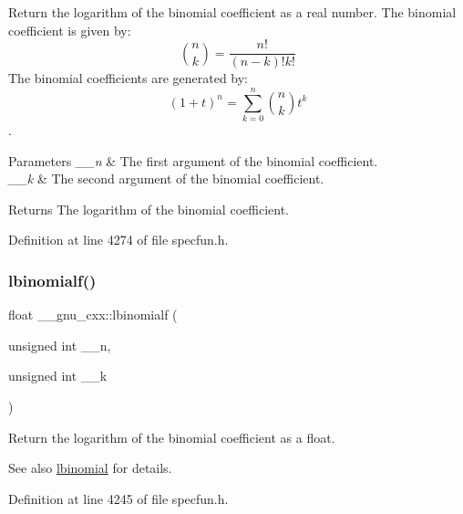 Return the logarithm of the binomial coefficient as a real number. The binomial coefficient is given by\+: \[ \binom{n}{k} = \frac{n!}{(n-k)! k!} \] The binomial coefficients are generated by\+: \[ \left(1 + t\right)^n = \sum_{k=0}^n \binom{n}{k} t^k \]. 


\begin{DoxyParams}{Parameters}
{\em \+\_\+\+\_\+n} & The first argument of the binomial coefficient. \\
\hline
{\em \+\_\+\+\_\+k} & The second argument of the binomial coefficient. \\
\hline
\end{DoxyParams}
\begin{DoxyReturn}{Returns}
The logarithm of the binomial coefficient. 
\end{DoxyReturn}


Definition at line 4274 of file specfun.\+h.

\mbox{\label{group__gnu__math__spec__func_ga2fe55bab4211fb240e1eb01341914129}} 
\subsubsection{\texorpdfstring{lbinomialf()}{lbinomialf()}}
{\footnotesize\ttfamily float \+\_\+\+\_\+gnu\+\_\+cxx\+::lbinomialf (\begin{DoxyParamCaption}\item[{unsigned int}]{\+\_\+\+\_\+n,  }\item[{unsigned int}]{\+\_\+\+\_\+k }\end{DoxyParamCaption})\hspace{0.3cm}{\ttfamily [inline]}}

Return the logarithm of the binomial coefficient as a {\ttfamily float}.

\begin{DoxySeeAlso}{See also}
\hyperlink{group__gnu__math__spec__func_gabfa5aeba56edfa110846fc8e76963bc2}{lbinomial} for details. 
\end{DoxySeeAlso}


Definition at line 4245 of file specfun.\+h.

\mbox{\label{group__gnu__math__spec__func_ga20e6c250e10e20b9e2c3f68bf9a3d4c1}} 
